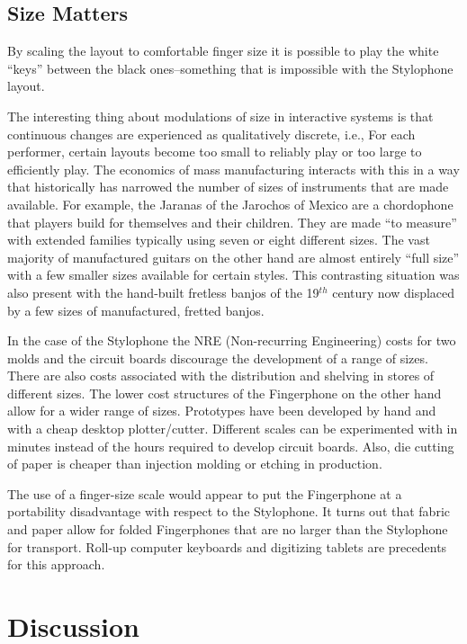 \subsection{Size Matters}

By scaling the layout to comfortable finger size it is possible to play the
white ``keys'' between the black ones--something that is impossible with the
Stylophone layout.

The interesting thing about modulations of size in interactive
systems is that continuous changes are experienced as qualitatively discrete,
i.e., For each performer, certain layouts become too small to reliably play or
too large to efficiently play. The economics of mass manufacturing interacts with
this in a way that historically has narrowed the number of sizes of instruments
that are made available. For example, the Jaranas of the Jarochos of Mexico are a
chordophone that players build for themselves and their children. They are made
``to measure'' with extended families typically using seven or eight different
sizes. The vast majority of manufactured guitars on the other hand are almost
entirely ``full size'' with a few smaller sizes available for certain styles.
This contrasting situation was also present with the hand-built fretless banjos
of the 19$^{th}$ century now displaced by a few sizes of manufactured, fretted
banjos.

In the case of the Stylophone the NRE (Non-recurring Engineering)
costs for two molds and the circuit boards discourage the development of a range
of sizes. There are also costs associated with the distribution and shelving in
stores of different sizes.  The lower cost structures of the Fingerphone on the
other hand allow for a wider range of sizes. Prototypes have been developed by
hand and with a cheap desktop plotter/cutter. Different scales can be
experimented with in minutes instead of the hours required to develop circuit
boards. Also, die cutting of paper is cheaper than injection molding or etching
in production.

The use of a finger-size scale would appear to put the Fingerphone
at a portability disadvantage with respect to the Stylophone.  It turns out that
fabric and paper allow for folded Fingerphones that are no larger than the
Stylophone for transport. Roll-up computer keyboards and digitizing tablets are
precedents for this approach.

\section{Discussion}

